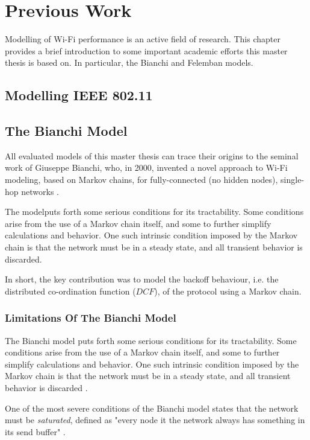 \chapter{Previous Work}

Modelling of Wi-Fi performance is an active field of research. This chapter provides a brief introduction to some important academic efforts this master thesis is based on. In particular, the Bianchi and Felemban models.

\section{Modelling IEEE 802.11}


\section{The Bianchi Model}

All evaluated models of this master thesis can trace their origins to the seminal work of Giuseppe Bianchi, who, in 2000, invented a novel approach to Wi-Fi modeling, based on Markov chains, for fully-connected (no hidden nodes), single-hop networks \cite{bianchi}.

The modelputs forth some serious conditions for its tractability. Some conditions arise from the use of a Markov chain itself, and some to further simplify calculations and behavior. One such intrinsic condition imposed by the Markov chain is that the network must be in a steady state, and all transient behavior is discarded.

In short, the key contribution was to model the backoff behaviour, i.e. the distributed co-ordination function ($DCF$), of the protocol using a Markov chain.

\subsection{Limitations Of The Bianchi Model}
The Bianchi model puts forth some serious conditions for its tractability. Some conditions arise from the use of a Markov chain itself, and some to further simplify calculations and behavior. One such intrinsic condition imposed by the Markov chain is that the network must be in a steady state, and all transient behavior is discarded \cite{bianchi}.

One of the most severe conditions of the Bianchi model states that the network must be \emph{saturated}, defined as "every node it the network always has something in its send buffer" \cite{bianchi}.

